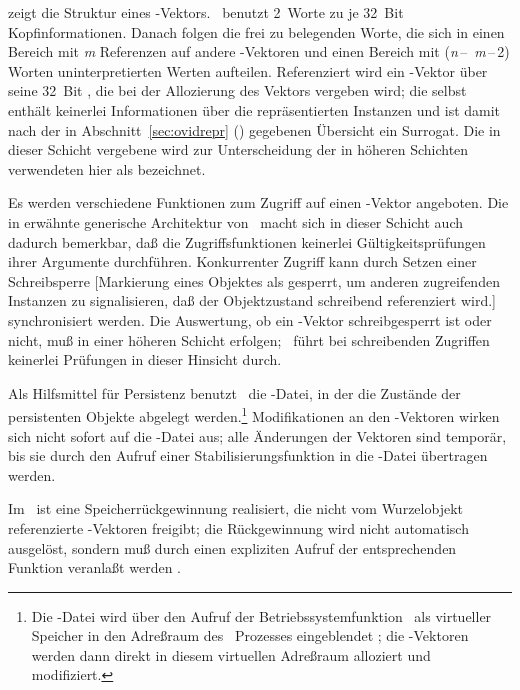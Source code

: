 %
zeigt die Struktur eines \postore-Vektors. \postore\ benutzt 2~Worte
zu je 32~Bit Kopf\mbox{}informationen. Danach folgen die frei zu
belegenden Worte, die sich in einen Bereich mit {\it m} Referenzen auf
andere \postore-Vektoren und einen Bereich mit ({\it n}\,--\,{\it
m}\,--\,2) Worten uninterpretierten Werten aufteilen. Referenziert wird
ein \postore-Vektor \"{u}ber seine 32~Bit \objid, die bei der
Allozierung des Vektors vergeben wird; die \objid\/ selbst enth\"{a}lt
keinerlei Informationen \"{u}ber die repr\"{a}sentierten Instanzen und ist
damit nach der in Abschnitt~\ref{sec:ovidrepr}
(\citepage{\pageref{sec:ovidrepr}}) gegebenen
\"{U}bersicht ein Surrogat. Die in dieser Schicht vergebene
\objid\/ wird zur Unterscheidung der in h\"{o}heren Schichten verwendeten
\sobjid\/ hier als \lobjid\/ bezeichnet.
%
\par{}Es werden verschiedene Funktionen zum Zugriff auf einen
\postore-Vektor angeboten. Die in \cite[]{bib:mu91}
erw\"{a}hnte generische Architektur von \postore\ macht sich in dieser
Schicht auch dadurch bemerkbar, da\ss{} die Zugriffsfunktionen keinerlei
G\"{u}ltigkeitspr\"{u}fungen ihrer Argumente durchf\"{u}hren. Konkurrenter
Zugriff kann durch Setzen einer Schreibsperre %
%
[Markierung eines Objektes als
\protect\rglq{}gesperrt\protect\rgrq, um anderen zugreifenden Instanzen
zu signalisieren, da\ss{} der Objektzustand schreibend referenziert
wird.]%
%
synchronisiert werden. Die Auswertung, ob ein \postore-Vektor
schreibgesperrt ist oder nicht, mu\ss{} in einer h\"{o}heren Schicht
erfolgen; \postore\ f\"{u}hrt bei schreibenden Zugriffen keinerlei
Pr\"{u}fungen in dieser Hinsicht durch.
%
\par{}Als Hilfsmittel f\"{u}r Persistenz benutzt \postore\ die \sh-Datei,
in der die Zust\"{a}nde der persistenten Objekte abgelegt
werden.\footnote{Die \sh-Datei wird \"{u}ber den Aufruf der
Betriebssystemfunktion \ als virtueller Speicher in
den Adre\ss{}raum des \unix\ Prozesses eingeblendet
\cite[]{bib:mu91} \cite[]{bib:gr93}
\cite{bib:mmap}; die \postore-Vektoren werden dann
direkt in diesem virtuellen Adre\ss{}raum alloziert und
modifiziert.} Modifikationen an den \postore-Vektoren wirken sich
nicht sofort auf die \sh-Datei aus; alle \"{A}nderungen der Vektoren
sind tempor\"{a}r, bis sie durch den Aufruf einer Stabilisierungsfunktion
in die \sh-Datei \"{u}bertragen werden.
%
\par{}Im \postore\ ist eine Speicherr\"{u}ckgewinnung realisiert, die
nicht vom Wurzelobjekt referenzierte \postore-Vektoren freigibt; die
R\"{u}ckgewinnung wird nicht automatisch ausgel\"{o}st, sondern mu\ss{} durch
einen expliziten Aufruf der entsprechenden Funktion veranla\ss{}t werden
\cite[]{bib:mu91}.
%
